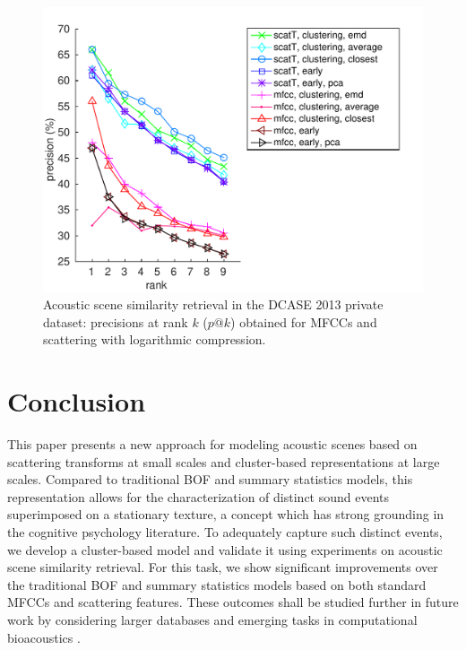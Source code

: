 \documentclass[smallextended]{svjour3}
\begin{document}
\begin{figure}[t]
\begin{center}
\includegraphics[width=\columnwidth]{figures/overall}
\caption{Acoustic scene similarity retrieval in the DCASE 2013 private dataset: precisions at rank $k$ ($p@k$) obtained for MFCCs and scattering with logarithmic compression.}
\label{fig:ASS_1}
\end{center}
\end{figure}

\section{Conclusion}

This paper presents a new approach for modeling acoustic scenes based on scattering transforms at small scales and cluster-based representations at large scales. Compared to traditional BOF and summary statistics models, this representation allows for the characterization of distinct sound events superimposed on a stationary texture, a concept which has strong grounding in the cognitive psychology literature. To adequately capture such distinct events, we develop a cluster-based model and validate it using experiments on acoustic scene similarity retrieval. For this task, we show significant improvements over the traditional BOF and summary statistics models based on both standard MFCCs and scattering features.
These outcomes shall be studied further in future work by considering larger databases and emerging tasks in computational bioacoustics \cite{wimmer2013sampling}.
\end{document}
